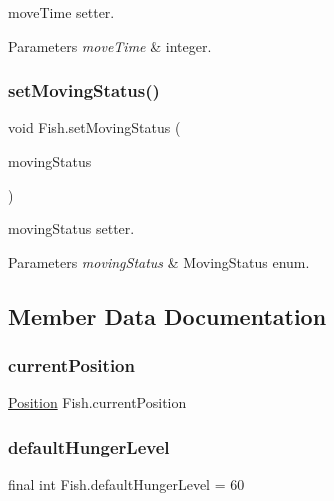 move\+Time setter. 
\begin{DoxyParams}{Parameters}
{\em move\+Time} & integer. \\
\hline
\end{DoxyParams}
\mbox{\label{class_fish_afcc56cacfeded2fb41f3de811aff9d45}} 
\subsubsection{\texorpdfstring{set\+Moving\+Status()}{setMovingStatus()}}
{\footnotesize\ttfamily void Fish.\+set\+Moving\+Status (\begin{DoxyParamCaption}\item[{\mbox{\hyperlink{enum_moving_object_1_1_moving_status}{Moving\+Status}}}]{moving\+Status }\end{DoxyParamCaption})\hspace{0.3cm}{\ttfamily [inline]}}

moving\+Status setter. 
\begin{DoxyParams}{Parameters}
{\em moving\+Status} & Moving\+Status enum. \\
\hline
\end{DoxyParams}


\subsection{Member Data Documentation}
\mbox{\label{class_fish_a1f025627baa1802f78dab5fef88b7838}} 
\subsubsection{\texorpdfstring{current\+Position}{currentPosition}}
{\footnotesize\ttfamily \mbox{\hyperlink{class_position}{Position}} Fish.\+current\+Position\hspace{0.3cm}{\ttfamily [protected]}}

\mbox{\label{class_fish_abb83de49d7a7fc239d603e11215e90f9}} 
\subsubsection{\texorpdfstring{default\+Hunger\+Level}{defaultHungerLevel}}
{\footnotesize\ttfamily final int Fish.\+default\+Hunger\+Level = 60\hspace{0.3cm}{\ttfamily [protected]}}

